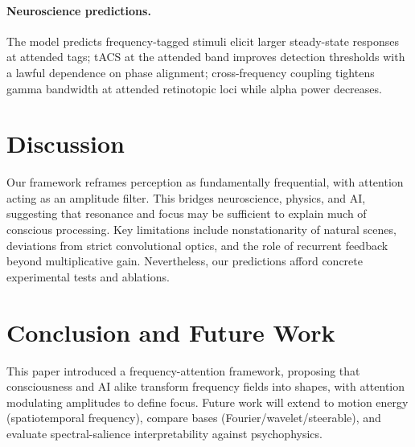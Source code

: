 \documentclass[12pt]{article}
\begin{document}
\paragraph{Neuroscience predictions.}
The model predicts frequency-tagged stimuli elicit larger steady-state responses at attended tags; tACS at the attended band improves detection thresholds with a lawful dependence on phase alignment; cross-frequency coupling tightens gamma bandwidth at attended retinotopic loci while alpha power decreases.

\section{Discussion}\label{sec:discussion}
%
Our framework reframes perception as fundamentally frequential, with attention acting as an amplitude filter. This bridges neuroscience, physics, and AI, suggesting that resonance and focus may be sufficient to explain much of conscious processing. Key limitations include nonstationarity of natural scenes, deviations from strict convolutional optics, and the role of recurrent feedback beyond multiplicative gain. Nevertheless, our predictions afford concrete experimental tests and ablations.

\section{Conclusion and Future Work}\label{sec:conclusion}
%
This paper introduced a frequency-attention framework, proposing that consciousness and AI alike transform frequency fields into shapes, with attention modulating amplitudes to define focus. Future work will extend to motion energy (spatiotemporal frequency), compare bases (Fourier/wavelet/steerable), and evaluate spectral-salience interpretability against psychophysics.
\end{document}
